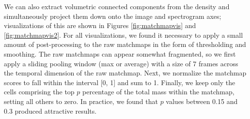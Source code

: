 We can also extract volumetric connected components from the density and simultaneously project them down onto the image and spectrogram axes; visualizations of this are shown in Figures \ref{fig:matchmapvis} and \ref{fig:matchmapvis2}. For all visualizations, we found it necessary to apply a small amount of post-processing to the raw matchmaps in the form of thresholding and smoothing. The raw matchmaps can appear somewhat fragmented, so we first apply a sliding pooling window (max or average) with a size of 7 frames across the temporal dimension of the raw matchmap. Next, we normalize the matchmap scores to fall within the interval [0, 1] and sum to 1. Finally, we keep only the cells comprising the top $p$ percentage of the total mass within the matchmap, setting all others to zero. In practice, we found that $p$ values between 0.15 and 0.3 produced attractive results.

